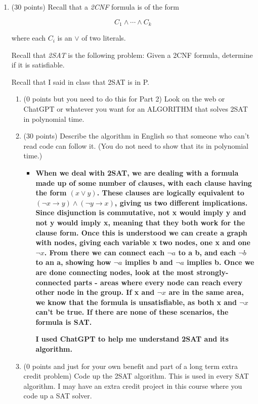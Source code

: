 \documentclass[12pt]{article}
\begin{document}
\begin{enumerate}
\begin{enumerate}
\bigskip

\end{enumerate}

\newpage

\item
(30 points)
Recall that a {\it 2CNF} formula is of the form 

$$C_1 \wedge \cdots \wedge C_k$$

where each $C_i$ is an $\vee$ of two literals. 

Recall that  {\it 2SAT} is the following problem: Given a 2CNF formula, determine
if it is satisfiable. 

Recall that I said in class that 2SAT is in P.

\begin{enumerate}
\item
(0 points but you need to do this for Part 2)
Look on the web or ChatGPT or whatever you want for an ALGORITHM that
solves 2SAT in polynomial time.
\item
(30 points) Describe the algorithm in English so that someone who
can't read code can follow it. (You do not need to show that its in polynomial time.) 
\begin{itemize}
    \item \textbf{When we deal with 2SAT, we are dealing with a formula made up of some number of clauses, with each clause having the form $ (x \vee y) $. These clauses are logically equivalent to $ (\neg x \rightarrow y) \wedge (\neg y \rightarrow x)$, giving us two different implications. Since disjunction is commutative, not x would imply y and not y would imply x, meaning that they both work for the clause form. Once this is understood we can create a graph with nodes, giving each variable x two nodes, one x and one $\neg x$. From there we can connect each $\neg a$ to a b, and each $\neg b$ to an a, showing how $\neg a$ implies b and $\neg a$ implies b.
    Once we are done connecting nodes, look at the most strongly-connected parts - areas where every node can reach every other node in the group. If x and $\neg x$ are in the same area, we know that the formula is unsatisfiable, as both x and $\neg x$ can't be true. If there are none of these scenarios, the formula is SAT.}
    
    \textbf{I used ChatGPT to help me understand 2SAT and its algorithm.}
\end{itemize}
\item
(0 points and just for your own benefit and part of a long term extra credit problem) 
Code up the 2SAT algorithm. 
This is used in every SAT algorithm. I may have an extra credit project in this course
where you code up a SAT solver. 
\end{enumerate}



\end{enumerate}
\end{document}
